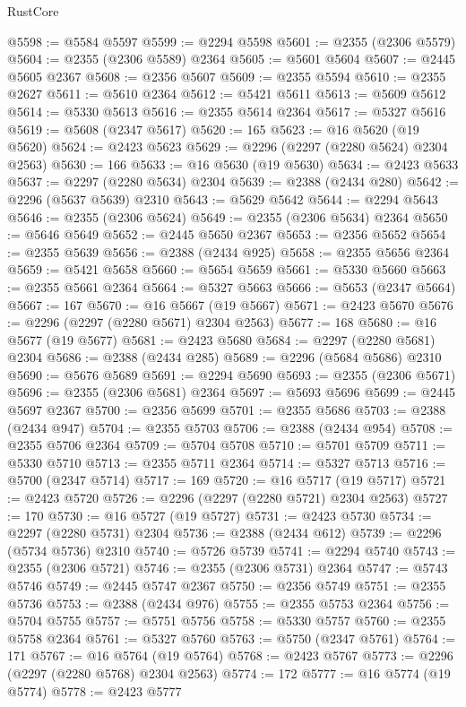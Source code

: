 \begin{lexlean}{RustCore}
\begin{coremodule}
@5598 := @5584 @5597
@5599 := @2294 @5598
@5601 := @2355 (@2306 @5579)
@5604 := @2355 (@2306 @5589) @2364
@5605 := @5601 @5604
@5607 := @2445 @5605 @2367
@5608 := @2356 @5607
@5609 := @2355 @5594
@5610 := @2355 @2627
@5611 := @5610 @2364
@5612 := @5421 @5611
@5613 := @5609 @5612
@5614 := @5330 @5613
@5616 := @2355 @5614 @2364
@5617 := @5327 @5616
@5619 := @5608 (@2347 @5617)
@5620 := 165
@5623 := @16 @5620 (@19 @5620)
@5624 := @2423 @5623
@5629 := @2296 (@2297 (@2280 @5624) @2304 @2563)
@5630 := 166
@5633 := @16 @5630 (@19 @5630)
@5634 := @2423 @5633
@5637 := @2297 (@2280 @5634) @2304
@5639 := @2388 (@2434 @280)
@5642 := @2296 (@5637 @5639) @2310
@5643 := @5629 @5642
@5644 := @2294 @5643
@5646 := @2355 (@2306 @5624)
@5649 := @2355 (@2306 @5634) @2364
@5650 := @5646 @5649
@5652 := @2445 @5650 @2367
@5653 := @2356 @5652
@5654 := @2355 @5639
@5656 := @2388 (@2434 @925)
@5658 := @2355 @5656 @2364
@5659 := @5421 @5658
@5660 := @5654 @5659
@5661 := @5330 @5660
@5663 := @2355 @5661 @2364
@5664 := @5327 @5663
@5666 := @5653 (@2347 @5664)
@5667 := 167
@5670 := @16 @5667 (@19 @5667)
@5671 := @2423 @5670
@5676 := @2296 (@2297 (@2280 @5671) @2304 @2563)
@5677 := 168
@5680 := @16 @5677 (@19 @5677)
@5681 := @2423 @5680
@5684 := @2297 (@2280 @5681) @2304
@5686 := @2388 (@2434 @285)
@5689 := @2296 (@5684 @5686) @2310
@5690 := @5676 @5689
@5691 := @2294 @5690
@5693 := @2355 (@2306 @5671)
@5696 := @2355 (@2306 @5681) @2364
@5697 := @5693 @5696
@5699 := @2445 @5697 @2367
@5700 := @2356 @5699
@5701 := @2355 @5686
@5703 := @2388 (@2434 @947)
@5704 := @2355 @5703
@5706 := @2388 (@2434 @954)
@5708 := @2355 @5706 @2364
@5709 := @5704 @5708
@5710 := @5701 @5709
@5711 := @5330 @5710
@5713 := @2355 @5711 @2364
@5714 := @5327 @5713
@5716 := @5700 (@2347 @5714)
@5717 := 169
@5720 := @16 @5717 (@19 @5717)
@5721 := @2423 @5720
@5726 := @2296 (@2297 (@2280 @5721) @2304 @2563)
@5727 := 170
@5730 := @16 @5727 (@19 @5727)
@5731 := @2423 @5730
@5734 := @2297 (@2280 @5731) @2304
@5736 := @2388 (@2434 @612)
@5739 := @2296 (@5734 @5736) @2310
@5740 := @5726 @5739
@5741 := @2294 @5740
@5743 := @2355 (@2306 @5721)
@5746 := @2355 (@2306 @5731) @2364
@5747 := @5743 @5746
@5749 := @2445 @5747 @2367
@5750 := @2356 @5749
@5751 := @2355 @5736
@5753 := @2388 (@2434 @976)
@5755 := @2355 @5753 @2364
@5756 := @5704 @5755
@5757 := @5751 @5756
@5758 := @5330 @5757
@5760 := @2355 @5758 @2364
@5761 := @5327 @5760
@5763 := @5750 (@2347 @5761)
@5764 := 171
@5767 := @16 @5764 (@19 @5764)
@5768 := @2423 @5767
@5773 := @2296 (@2297 (@2280 @5768) @2304 @2563)
@5774 := 172
@5777 := @16 @5774 (@19 @5774)
@5778 := @2423 @5777

\end{coremodule}
\end{lexlean}
